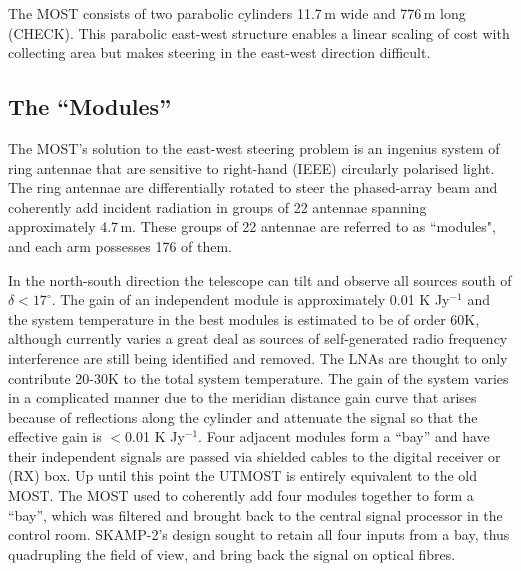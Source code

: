 
The MOST consists of two parabolic cylinders 11.7\,m wide and 776\,m long (CHECK). This parabolic east-west structure enables a linear scaling of cost with collecting area but makes steering in the east-west direction difficult.

\subsection{The ``Modules''}
The MOST's solution to the east-west steering problem is an ingenius system of ring antennae that are sensitive to right-hand (IEEE) circularly polarised light. The ring antennae are differentially rotated to steer the phased-array beam and coherently add incident radiation in groups of 22 antennae spanning approximately 4.7\,m. These groups of 22 antennae are referred to as ``modules", and each arm possesses 176 of them. 

In the north-south direction the telescope can tilt and observe all sources south of $\delta<17^\circ$. The gain of an independent module is approximately 0.01 K Jy$^{-1}$ and the system temperature in the best modules is estimated to be of order 60K, although currently varies a great deal as sources of self-generated radio frequency interference are still being identified and removed. The LNAs are thought to only contribute 20-30K to the total system temperature. The gain of the system varies in a complicated manner due to the meridian distance gain curve that arises because of reflections along the cylinder and attenuate the signal so that the effective gain is $<$0.01 K Jy$^{-1}$\cite{Hunstead_1996}.
Four adjacent modules form a ``bay'' and have their independent signals are passed via shielded cables to the digital receiver or (RX) box. Up until this point the UTMOST is entirely equivalent to the old MOST. The MOST used to coherently add four modules together to form a ``bay'', which was filtered and brought back to the central signal processor in the control room. SKAMP-2's design sought to retain all four inputs from a bay, thus quadrupling the field of view, and bring back the signal on optical fibres.
